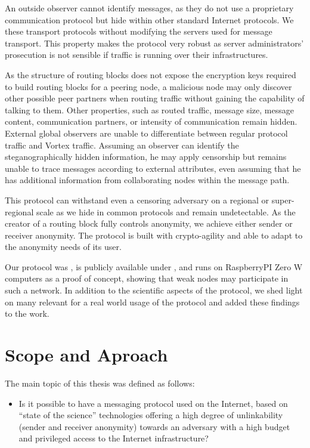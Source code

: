 An outside observer cannot identify messages, as they do not use a proprietary communication protocol but hide within other standard Internet protocols. We  these transport protocols without modifying the servers used for message transport. This property makes the protocol very robust as server administrators' prosecution is not sensible if traffic is running over their infrastructures. 

As the structure of routing blocks does not expose the encryption keys required to build routing blocks for a peering node, a malicious node may only discover other possible peer partners when routing traffic without gaining the capability of talking to them. Other properties, such as routed traffic, message size, message content, communication partners, or intensity of communication remain hidden. External global observers are unable to differentiate between regular protocol traffic and Vortex traffic. Assuming an observer can identify the steganographically hidden information, he may apply censorship but remains unable to trace messages according to external attributes, even assuming that he has additional information from collaborating nodes within the message path.

This protocol can withstand even a censoring adversary on a regional or super-regional scale as we hide in common protocols and remain undetectable. As the creator of a routing block fully controls anonymity, we achieve either sender or receiver anonymity. The protocol is built with crypto-agility and able to adapt to the anonymity needs of its user.

Our protocol was , is publicly available under \href{https://messagevortex.net/}, and runs on RaspberryPI Zero W computers as a proof of concept, showing that weak nodes may participate in such a network. In addition to the scientific aspects of the protocol, we shed light on many  relevant for a real world usage of the protocol and added these findings to the work.

\chapter{Scope and Aproach}
The main topic of this thesis was defined as follows:

\begin{itemize}
	\item Is it possible to have a messaging protocol used on the Internet, based on ``state of the science'' technologies offering a high degree of unlinkability (sender and receiver anonymity) towards an adversary with a high budget and privileged access to the Internet infrastructure?
\end{itemize}

